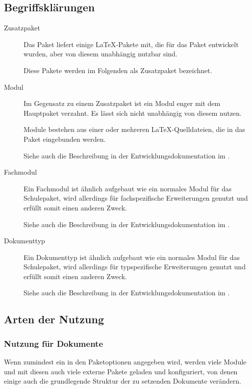 \subsection{Begriffsklärungen}
	\label{sec:begriffe}
	\begin{description}
		\item[Zusatzpaket] 
			Das Paket  liefert einige \LaTeX-Pakete mit,
			die für das Paket entwickelt wurden, aber von diesem
			unabhängig nutzbar sind.
		
			Diese Pakete werden im Folgenden als Zusatzpaket
			bezeichnet.
		
		\item[Modul]
			Im Gegensatz zu einem Zusatzpaket ist ein Modul
			enger mit dem Hauptpaket verzahnt. Es lässt sich nicht
			unabhängig von diesem nutzen.
		
			Module bestehen aus einer oder mehreren
			\LaTeX-Quelldateien, die in das Paket eingebunden werden.
			
			Siehe auch die Beschreibung in der 
			Entwicklungsdokumentation im 
			.
			
		\item[Fachmodul]
			Ein Fachmodul ist ähnlich aufgebaut wie ein	normales 
			Modul für das Schulepaket, wird allerdings für 
			fachspezifische Erweiterungen genutzt und erfüllt somit 
			einen anderen Zweck.
			
			Siehe auch die Beschreibung in der 
			Entwicklungsdokumentation im 
			.
						
		\item[Dokumenttyp]
			Ein Dokumenttyp ist ähnlich aufgebaut wie ein normales 
			Modul für das Schulepaket, wird allerdings für 
			typspezifische Erweiterungen genutzt und erfüllt somit 
			einen anderen Zweck.
			
			Siehe auch die Beschreibung in der 
			Entwicklungsdokumentation im 
			.
					
	\end{description}
	
\subsection{Arten der Nutzung}
	\subsubsection{Nutzung für Dokumente}
		Wenn zumindest ein  in den Paketoptionen angegeben
		wird, werden viele Module und mit diesen auch viele externe
		Pakete geladen und konfiguriert, von denen einige auch die
		grundlegende Struktur der zu setzenden Dokumente verändern.
		
